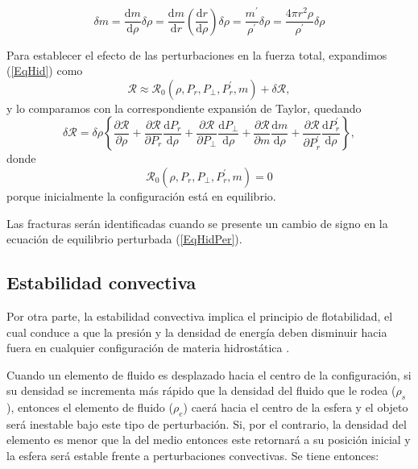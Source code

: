 \documentclass[letterpaper,11pt]{article}
\begin{document}
\begin{equation}
\delta m = \frac{\mathrm{d} m}{\mathrm{d} \rho} \delta \rho = \frac{\mathrm{d} m}{\mathrm{d} r} \left(\frac{\mathrm{d} r}{\mathrm{d} \rho} \right) \delta \rho = \frac{m^{\prime}}{\rho^{\prime}} \delta \rho = \frac{4 \pi r^{2} \rho}{\rho^{\prime}} \delta \rho
\end{equation}

Para establecer el efecto de las perturbaciones en la fuerza total, expandimos (\ref{EqHid}) como
\begin{equation}
\mathcal{R} \approx \mathcal{R}_{0} \left( \rho, P_{r}, P_{\perp}, P_{r}^{\prime}, m \right) + \delta \mathcal{R} ,
\end{equation}
y lo comparamos con la correspondiente expansión de Taylor, quedando
\begin{equation}
\label{EqHidPer}
\delta \mathcal{R} = \delta \rho \left\lbrace \frac{\partial \mathcal{R}}{\partial \rho} + \frac{\partial \mathcal{R}}{\partial P_{r}} \frac{\mathrm{d} P_{r}}{\mathrm{d} \rho} + \frac{\partial \mathcal{R}}{\partial P_{\perp}} \frac{\mathrm{d} P_{\perp}}{\mathrm{d} \rho} + \frac{\partial \mathcal{R}}{\partial m} \frac{\mathrm{d} m}{\mathrm{d} \rho} + \frac{\partial \mathcal{R}}{\partial P_{r}^{\prime}} \frac{\mathrm{d} P_{r}^{\prime}}{\mathrm{d} \rho} \right\rbrace , 
\end{equation}
donde 
\begin{equation}
\mathcal{R}_{0}(\rho, P_{r}, P_{\perp}, P_{r}^{\prime}, m) = 0
\end{equation}
porque inicialmente la configuración está en equilibrio.

Las fracturas serán identificadas cuando se presente un cambio de signo en la ecuación de equilibrio perturbada (\ref{EqHidPer}).



\subsection{Estabilidad convectiva}

Por otra parte, la estabilidad convectiva implica el principio de flotabilidad, el cual conduce a que la presión y la densidad de energía deben disminuir hacia fuera en cualquier configuración de materia hidrostática \cite{Bondi1964B,Thorne1966,Kovetz1967}.

Cuando un elemento de fluido es desplazado hacia el centro de la configuración, si su densidad se incrementa más rápido que la densidad del fluido que le rodea ($\rho_s$), entonces el elemento de fluido ($\rho_e$) caerá hacia el centro de la esfera y el objeto será inestable bajo este tipo de perturbación. Si, por el contrario, la densidad del elemento es menor que la del medio entonces este retornará a su posición inicial y la esfera será estable frente a perturbaciones convectivas. Se tiene entonces:
\end{document}
